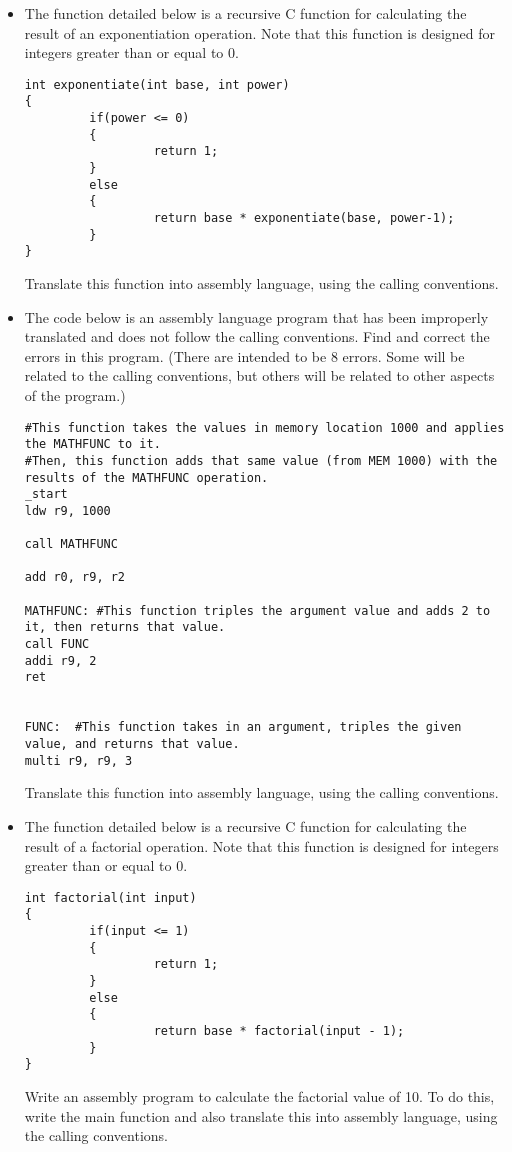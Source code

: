 \documentclass[10pt]{article}
\begin{document}
\begin{itemize}

\setlength\itemsep{10mm}


\item The function detailed below is a recursive C function for calculating the result of an exponentiation operation.  Note that this function is designed for integers greater than or equal to 0.
    \begin{verbatim}
int exponentiate(int base, int power)
{
         if(power <= 0)
         {
                  return 1;
         }
         else
         {
                  return base * exponentiate(base, power-1);
         }
}
    \end{verbatim}

Translate this function into assembly language, using the calling conventions.  
    \vspace{3in}
\newpage
\item The code below is an assembly language program that has been improperly translated and does not follow the calling conventions.  Find and correct the errors in this program.  (There are intended to be 8 errors.  Some will be related to the calling conventions, but others will be related to other aspects of the program.)
    \begin{verbatim}
#This function takes the values in memory location 1000 and applies the MATHFUNC to it.
#Then, this function adds that same value (from MEM 1000) with the results of the MATHFUNC operation.
_start
ldw r9, 1000

call MATHFUNC

add r0, r9, r2

MATHFUNC: #This function triples the argument value and adds 2 to it, then returns that value.
call FUNC
addi r9, 2
ret


FUNC:  #This function takes in an argument, triples the given value, and returns that value.
multi r9, r9, 3
    \end{verbatim}

Translate this function into assembly language, using the calling conventions. 


    \vspace{1in}

\item The function detailed below is a recursive C function for calculating the result of a factorial operation.  Note that this function is designed for integers greater than or equal to 0.
    \begin{verbatim}
int factorial(int input)
{
         if(input <= 1)
         {
                  return 1;
         }
         else
         {
                  return base * factorial(input - 1);
         }
}
    \end{verbatim}

Write an assembly program to calculate the factorial value of 10.  To do this, write the main function and also translate this into assembly language, using the calling conventions.  
    \vspace{3in}

\newpage





\end{itemize}
\end{document}
